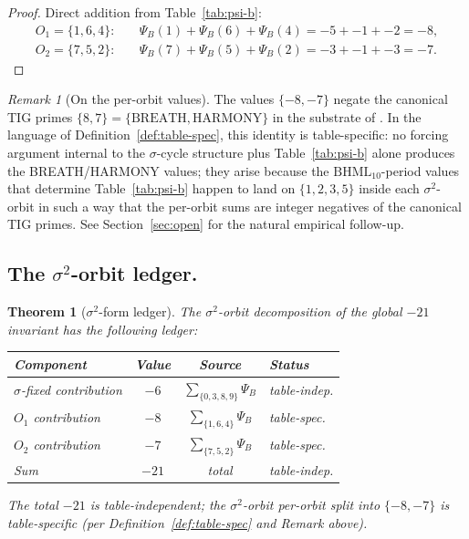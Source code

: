 \documentclass[11pt,reqno]{amsart}
\theoremstyle{plain}
\newtheorem{theorem}{Theorem}[section]
\theoremstyle{definition}
\theoremstyle{remark}
\newtheorem*{remark}{Remark}
\newcommand{\BH}{\mathrm{BHML}}
\newcommand{\sig}{\sigma}
\begin{document}
\begin{proof}
Direct addition from Table~\ref{tab:psi-b}:
\begin{align*}
O_{1} = \{1, 6, 4\}: &\quad
\Psi_{B}(1) + \Psi_{B}(6) + \Psi_{B}(4)
= -5 + -1 + -2 = -8, \\
O_{2} = \{7, 5, 2\}: &\quad
\Psi_{B}(7) + \Psi_{B}(5) + \Psi_{B}(2)
= -3 + -1 + -3 = -7.
\end{align*}
\end{proof}

\begin{remark}[On the per-orbit values]
The values $\{-8, -7\}$ negate the canonical TIG primes
$\{8, 7\} = \{\mathrm{BREATH}, \mathrm{HARMONY}\}$ in the substrate of
\cite{SandersGishFourCore}.  In the language of
Definition~\ref{def:table-spec}, this identity is table-specific:
no forcing argument internal to the $\sig$-cycle structure plus
Table~\ref{tab:psi-b} alone produces the BREATH/HARMONY values; they
arise because the $\BH_{10}$-period values that determine
Table~\ref{tab:psi-b} happen to land on $\{1, 2, 3, 5\}$ inside each
$\sig^{2}$-orbit in such a way that the per-orbit sums are integer
negatives of the canonical TIG primes.  See Section~\ref{sec:open}
for the natural empirical follow-up.
\end{remark}

\subsection{The $\sig^{2}$-orbit ledger.}
\begin{theorem}[$\sig^{2}$-form ledger]\label{thm:cm-sigma2}
The $\sig^{2}$-orbit decomposition of the global $-21$ invariant has
the following ledger:
\begin{center}
\begin{tabular}{l c c l}
\toprule
Component & Value & Source & Status \\
\midrule
$\sig$-fixed contribution & $-6$ & $\sum_{\{0,3,8,9\}} \Psi_B$ & table-indep. \\
$O_{1}$ contribution      & $-8$ & $\sum_{\{1,6,4\}}\Psi_B$    & table-spec.\\
$O_{2}$ contribution      & $-7$ & $\sum_{\{7,5,2\}}\Psi_B$    & table-spec.\\
\midrule
Sum                       & $-21$ & total                       & table-indep. \\
\bottomrule
\end{tabular}
\end{center}
The total $-21$ is table-independent; the $\sig^{2}$-orbit per-orbit
split into $\{-8, -7\}$ is table-specific (per
Definition~\ref{def:table-spec} and Remark above).
\end{theorem}
\end{document}

